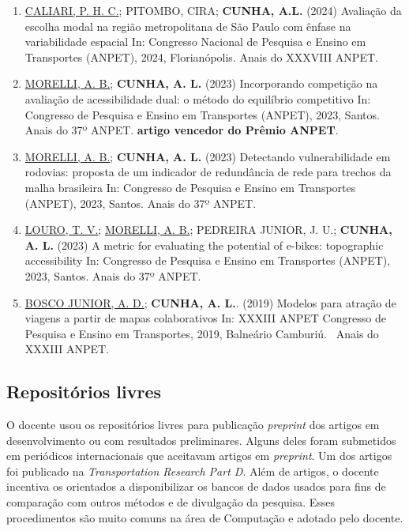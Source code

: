 \documentclass[
  brazilian,
  11pt,
  a4paper,
]{article}
\begin{document}
\begin{enumerate}
\def\labelenumi{\arabic{enumi}.}
\item
  \ul{CALIARI, P. H. C.}; PITOMBO, CIRA; \textbf{CUNHA, A.L.} (2024)
  Avaliação da escolha modal na região metropolitana de São Paulo com
  ênfase na variabilidade espacial In: Congresso Nacional de Pesquisa e
  Ensino em Transportes (ANPET), 2024, Florianópolis. Anais do XXXVIII
  ANPET.
\item
  \ul{MORELLI, A. B.}; \textbf{CUNHA, A. L.} (2023) Incorporando
  competição na avaliação de acessibilidade dual: o método do equilíbrio
  competitivo In: Congresso de Pesquisa e Ensino em Transportes (ANPET),
  2023, Santos. Anais do 37º ANPET. \textbf{artigo vencedor do Prêmio
  ANPET}.
\item
  \ul{MORELLI, A. B.}; \textbf{CUNHA, A. L.} (2023) Detectando
  vulnerabilidade em rodovias: proposta de um indicador de redundância
  de rede para trechos da malha brasileira In: Congresso de Pesquisa e
  Ensino em Transportes (ANPET), 2023, Santos. Anais do 37º ANPET.
\item
  \ul{LOURO, T. V.}; \ul{MORELLI, A. B.}; PEDREIRA JUNIOR, J. U.;
  \textbf{CUNHA, A. L.} (2023) A metric for evaluating the potential of
  e-bikes: topographic accessibility In: Congresso de Pesquisa e Ensino
  em Transportes (ANPET), 2023, Santos. Anais do 37º ANPET.
\item
  \ul{BOSCO JUNIOR, A. D.}; \textbf{CUNHA, A. L.}. (2019) Modelos para
  atração de viagens a partir de mapas colaborativos In: XXXIII ANPET
  Congresso de Pesquisa e Ensino em Transportes, 2019, Balneário
  Camburiú.~ Anais do XXXIII ANPET.
\end{enumerate}

\subsection{Repositórios livres}\label{reposituxf3rios-livres}

O docente usou os repositórios livres para publicação \emph{preprint}
dos artigos em desenvolvimento ou com resultados preliminares. Alguns
deles foram submetidos em periódicos internacionais que aceitavam
artigos em \emph{preprint}. Um dos artigos foi publicado na
\emph{Transportation Research Part D}. Além de artigos, o docente
incentiva os orientados a disponibilizar os bancos de dados usados para
fins de comparação com outros métodos e de divulgação da pesquisa. Esses
procedimentos são muito comuns na área de Computação e adotado pelo
docente.
\end{document}
